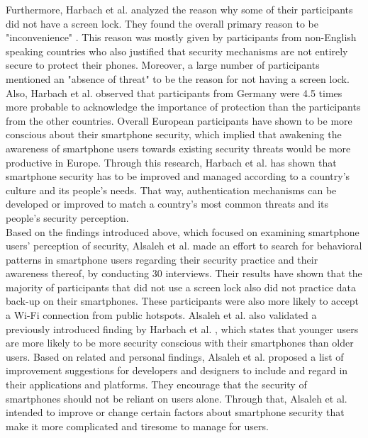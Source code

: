 Furthermore, Harbach et al. \cite{Harbach:2016} analyzed the reason why some of their participants did not have a screen lock. They found the overall primary reason to be "inconvenience" \cite{Harbach:2016}. This reason was mostly given by participants from non-English speaking countries who also justified that security mechanisms are not entirely secure to protect their phones. Moreover, a large number of participants mentioned an "absence of threat" \cite{Harbach:2016} to be the reason for not having a screen lock. Also, Harbach et al. \cite{Harbach:2016} observed that participants from Germany were 4.5 times more probable to acknowledge the importance of protection than the participants from the other countries. Overall European participants have shown to be more conscious about their smartphone security, which implied that awakening the awareness of smartphone users towards existing security threats would be more productive in Europe. Through this research, Harbach et al. \cite{Harbach:2016} has shown that smartphone security has to be improved and managed according to a country's culture and its people's needs. That way, authentication mechanisms can be developed or improved to match a country's most common threats and its people's security perception.\\ 

Based on the findings introduced above, which focused on examining smartphone users' perception of security, Alsaleh et al. \cite{Alsaleh} made an effort to search for behavioral patterns in smartphone users regarding their security practice and their awareness thereof, by conducting 30 interviews. Their results have shown that the majority of participants that did not use a screen lock also did not practice data back-up on their smartphones. These participants were also more likely to accept a Wi-Fi connection from public hotspots. Alsaleh et al. \cite{Alsaleh} also validated a previously introduced finding by Harbach et al. \cite{Harbach:2016}, which states that younger users are more likely to be more security conscious with their smartphones than older users. Based on related and personal findings, Alsaleh et al. \cite{Alsaleh} proposed a list of improvement suggestions for developers and designers to include and regard in their applications and platforms. They encourage that the security of smartphones should not be reliant on users alone. Through that, Alsaleh et al. \cite{Alsaleh} intended to improve or change certain factors about smartphone security that make it more complicated and tiresome to manage for users.\\

